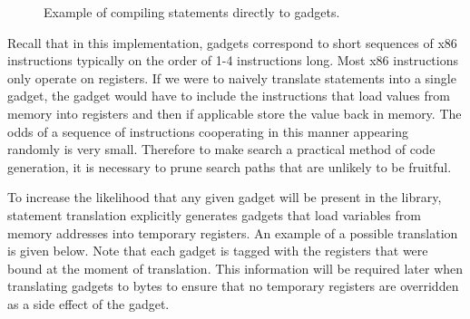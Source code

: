     \begin{figure}
        \centering
        \caption{Example of compiling statements directly to gadgets.}
        \label{fig:method-direct-to-gadget}
    \end{figure}

    Recall that in this implementation, gadgets correspond to short sequences of
    x86 instructions typically on the order of 1-4 instructions long. Most x86
    instructions only operate on registers. If we were to naively translate
    statements into a single gadget, the gadget would have to include the
    instructions that load values from memory into registers and then if
    applicable store the value back in memory. The odds of a sequence of
    instructions cooperating in this manner appearing randomly is very small.
    Therefore to make search a practical method of code generation, it is
    necessary to prune search paths that are unlikely to be fruitful.

    To increase the likelihood that any given gadget will be present in the
    library, statement translation explicitly generates gadgets that load
    variables from memory addresses into temporary registers. An example of a
    possible translation is given below. Note that each gadget is tagged with
    the registers that were bound at the moment of translation. This information
    will be required later when translating gadgets to bytes to ensure that no
    temporary registers are overridden as a side effect of the gadget.

